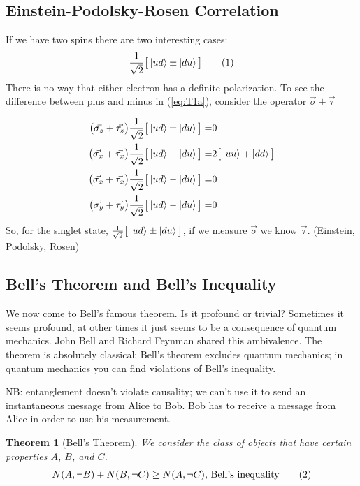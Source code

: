 \documentclass[]{article}
\newcommand\numberthis{\addtocounter{equation}{1}\tag{\theequation}}
\newtheorem{thm}{Theorem}
\begin{document}
\subsection{Einstein-Podolsky-Rosen Correlation}

If we have two spins there are two interesting cases:
\begin{align*}
	\frac{1}{\sqrt{2}}\big[\ket{ud}\pm\ket{du}\big] \numberthis \label{eq:T1a}
\end{align*}
There is no way that either electron has a definite polarization. To see the difference between plus and minus in (\ref{eq:T1a}), consider the operator $\vec{\sigma} + \vec{\tau}$

\begin{align*}
	\big(\vec{\sigma_z} + \vec{\tau_z}\big)\frac{1}{\sqrt{2}}\big[\ket{ud}\pm\ket{du}\big]=& 0\\
	\big(\vec{\sigma_x} + \vec{\tau_x}\big)\frac{1}{\sqrt{2}}\big[\ket{ud}+\ket{du}\big]=& 2 \big[\ket{uu}+\ket{dd}\big]\\
	\big(\vec{\sigma_x} + \vec{\tau_x}\big)\frac{1}{\sqrt{2}}\big[\ket{ud}-\ket{du}\big]=& 0\\
	\big(\vec{\sigma_y} + \vec{\tau_y}\big)\frac{1}{\sqrt{2}}\big[\ket{ud}-\ket{du}\big]=& 0
\end{align*}
So, for the singlet state, $\frac{1}{\sqrt{2}}\big[\ket{ud}\pm\ket{du}\big]$, if we measure $\vec{\sigma}$ we know $\vec{\tau}$. (Einstein, Podolsky, Rosen)\cite{einstein1935can}

\subsection{Bell's Theorem and Bell's Inequality}\label{sec:bell}

We now come to Bell's famous theorem\cite{bell1964einstein}. Is it profound or trivial? Sometimes it seems profound, at other times it just seems to be a consequence of quantum mechanics. John Bell and Richard Feynman shared this ambivalence. The theorem is absolutely classical:  Bell's theorem excludes quantum mechanics; in quantum mechanics you can find violations of Bell's inequality.

NB: entanglement doesn't violate causality; we can't use it to send an instantaneous message from Alice to Bob. Bob has to receive a message from Alice in order to use his measurement.

\begin{thm}[Bell's Theorem]
We consider the class of objects that have certain properties $A$, $B$, and $C$.
	\begin{align*}
		N(A, \neg B) + N(B, \neg C) \ge N(A,\neg C)\text{,  Bell's inequality} \numberthis \label{eq:bell:inequality}
	\end{align*}
\end{thm}
\end{document}
